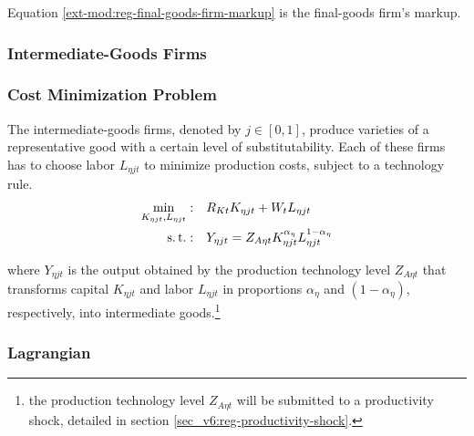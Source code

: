 \documentclass[../thesis.tex]{subfiles}
\begin{document}
Equation \ref{ext-mod:reg-final-goods-firm-markup} is the final-goods firm's markup.


\subsubsection{Intermediate-Goods Firms}

\subsubsection*{Cost Minimization Problem}

The intermediate-goods firms, denoted by $j \in [0,1]$, produce varieties of a representative good with a certain level of substitutability. Each of these firms has to choose labor $L_{\eta jt}$ to minimize production costs, subject to a technology rule.
\begin{align}
	\label{ext-mod:reg-int-good-firm-total-cost}
	\min_{K_{\eta jt}, L_{\eta jt}}: \quad & R_{Kt} K_{\eta jt} + W_t L_{\eta jt} \\
	\label{ext-mod:reg-int-good-firm-prod-function}
	\operatorname{s.t.}: \quad & Y_{\eta jt} = Z_{A\eta t} K_{\eta jt}^{\alpha_{\eta}} L_{\eta jt}^{1-{\alpha_{\eta}}}
\end{align}

\begin{comment}
	
	\begin{tcolorbox}[colback=red!5!white,colframe=red!75!black]
		“We set this parameter so that profits are zero in steady state” [Adolfson et al., 2014, p. 36] 
	\end{tcolorbox}	

\end{comment}

where $Y_{\eta jt}$ is the output obtained by the production technology level $Z_{A\eta t}$ that transforms capital $K_{\eta jt}$ and labor $L_{\eta jt}$ in proportions ${\alpha_{\eta}}$ and $(1-{\alpha_{\eta}})$, respectively, into intermediate goods.\footnote{the production technology level $Z_{A\eta t}$ will be submitted to a productivity shock, detailed in section \ref{sec_v6:reg-productivity-shock}.}

\subsubsection*{Lagrangian}
\end{document}
